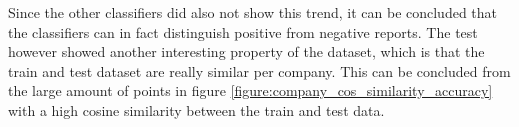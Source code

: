 Since the other classifiers did also not show this trend, it can be concluded that the classifiers can in fact distinguish positive from negative reports.
The test however showed another interesting property of the dataset, which is that the train and test dataset are really similar per company.
This can be concluded from the large amount of points in figure \ref{figure:company_cos_similarity_accuracy} with a high cosine similarity between the train and test data.





